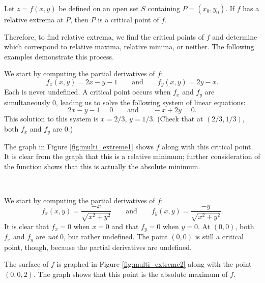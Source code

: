 {Let $z=f(x,y)$ be defined on an open set $S$ containing $P=(x_0,y_0)$. If $f$ has a relative extrema at $P$, then $P$ is a critical point of $f$.
}

Therefore, to find relative extrema, we find the critical points of $f$ and determine which correspond to relative maxima, relative minima, or neither. The following examples demonstrate this process.\\

{We start by computing the partial derivatives of $f$:
$$f_x(x,y) = 2x-y-1 \qquad \text{and}\qquad f_y(x,y) = 2y-x.$$
Each is never undefined. A critical point occurs when $f_x$ and $f_y$ are simultaneously 0, leading us to solve the following system of linear equations:
$$2x-y-1 = 0\qquad \text{and}\qquad -x+2y = 0.$$
This solution to this system is $x=2/3$, $y=1/3$. (Check that at $(2/3,1/3)$, both $f_x$ and $f_y$ are 0.)

The graph in Figure \ref{fig:multi_extreme1} shows $f$ along with this critical point. It is clear from the graph that this is a relative minimum; further consideration of the function shows that this is actually the absolute minimum.
}\\

{We start by computing the partial derivatives of $f$:
$$f_x(x,y) = \frac{-x}{\sqrt{x^2+y^2}}\qquad \text{and}\qquad f_y(x,y) = \frac{-y}{\sqrt{x^2+y^2}}.$$
It is clear that $f_x=0$ when $x=0$ and that $f_y=0$ when $y=0$. At $(0,0)$, both $f_x$ and $f_y$ are \textit{not} $0$, but rather undefined. The point $(0,0)$ is still a critical point, though, because the partial derivatives are undefined.

The surface of $f$ is graphed in Figure \ref{fig:multi_extreme2} along with the point $(0,0,2)$. The graph shows that this point is the absolute maximum of $f$.
}\\

